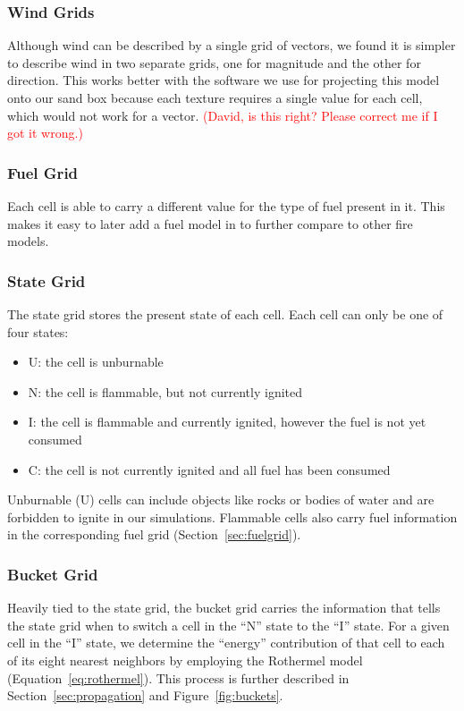 \documentclass{article}
\newcommand{\note}[1]{\textcolor{red}{#1}}
\begin{document}
\subsubsection{Wind Grids\label{sec:windgrid}}
Although wind can be described by a single grid of vectors, we found it is simpler to describe wind in two separate grids, one for magnitude and the other for direction. This works better with the software we use for projecting this model onto our sand box because each texture requires a single value for each cell, which would not work for a vector. \note{(David, is this right? Please correct me if I got it wrong.)}

\subsubsection{Fuel Grid\label{sec:fuelgrid}}
Each cell is able to carry a different value for the type of fuel present in it. This makes it easy to later add a fuel model in to further compare to other fire models. 

\subsubsection{State Grid}
The state grid stores the present state of each cell. Each cell can only be one of four states:
\begin{itemize}
\item U: the cell is unburnable
\item N: the cell is flammable, but not currently ignited
\item I: the cell is flammable and currently ignited, however the fuel is not yet consumed
\item C: the cell is not currently ignited and all fuel has been consumed
\end{itemize}

Unburnable (U) cells can include objects like rocks or bodies of water and are forbidden to ignite in our simulations. Flammable cells also carry fuel information in the corresponding fuel grid (Section~\ref{sec:fuelgrid}).


\subsubsection{Bucket Grid}
Heavily tied to the state grid, the bucket grid carries the information that tells the state grid when to switch a cell in the ``N'' state to the ``I'' state. For a given cell in the ``I'' state, we determine the ``energy'' contribution of that cell to each of its eight nearest neighbors by employing the Rothermel model (Equation~\ref{eq:rothermel}). This process is further described in Section~\ref{sec:propagation} and Figure~\ref{fig:buckets}.
\end{document}
